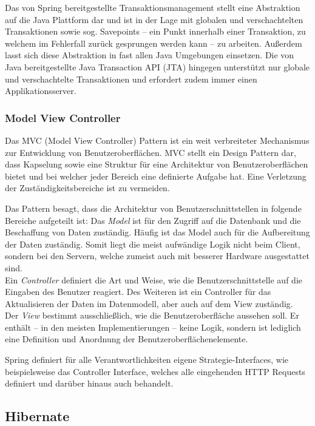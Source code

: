				Das von Spring bereitgestellte Transaktionsmanagement stellt eine Abstraktion auf die Java Plattform dar und ist in der Lage mit globalen und verschachtelten Transaktionen sowie sog. Savepoints -- ein Punkt innerhalb einer Transaktion, zu welchem im Fehlerfall zurück gesprungen werden kann -- zu arbeiten. Außerdem lasst sich diese Abstraktion in fast allen Java Umgebungen einsetzen. Die von Java bereitgestellte Java Transaction API (\ac{JTA}) hingegen unterstützt nur globale und verschachtelte Transaktionen und erfordert zudem immer einen Applikationsserver. 
			
			\subsubsection{Model View Controller} %
			
				Das \ac{MVC} (Model View Controller) Pattern ist ein weit verbreiteter Mechanismus zur Entwicklung von Benutzeroberflächen. \ac{MVC} stellt ein Design Pattern dar, dass Kapselung sowie eine Struktur für eine Architektur von Benutzeroberflächen bietet und bei welcher jeder Bereich eine definierte Aufgabe hat. Eine Verletzung der Zuständigkeitsbereiche ist zu vermeiden. \cite{Gamma.1995}
			
				Das Pattern besagt, dass die Architektur von Benutzerschnittstellen in folgende Bereiche aufgeteilt ist: Das \textit{Model} ist für den Zugriff auf die Datenbank und die Beschaffung von Daten zuständig. Häufig ist das Model auch für die Aufbereitung der Daten zuständig. Somit liegt die meist aufwändige Logik nicht beim Client, sondern bei den Servern, welche zumeist auch mit besserer Hardware ausgestattet sind. \\
				Ein \textit{Controller} definiert die Art und Weise, wie die Benutzerschnittstelle auf die Eingaben des Benutzer reagiert. Des Weiteren ist ein Controller für das Aktualisieren der Daten im Datenmodell, aber auch auf dem View zuständig. \\
				Der \textit{View} bestimmt ausschließlich, wie die Benutzeroberfläche aussehen soll. Er enthält -- in den meisten Implementierungen -- keine Logik, sondern ist lediglich eine Definition und Anordnung der Benutzeroberflächenelemente.
				
				Spring definiert für alle Verantwortlichkeiten eigene Strategie-Interfaces, wie beispielsweise das Controller Interface, welches alle eingehenden \ac{HTTP} Requests definiert und darüber hinaus auch behandelt. 

		
		\subsection{Hibernate} %
		
